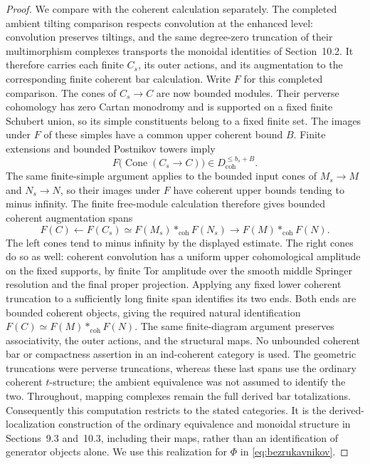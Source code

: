 \documentclass[11pt]{article}
\numberwithin{equation}{section}
\theoremstyle{definition}
\theoremstyle{remark}
\begin{document}
\begin{proof}
We compare with the coherent calculation separately.  The completed
ambient tilting comparison respects convolution at the enhanced
level: convolution preserves tiltings, and the same degree-zero
truncation of their multimorphism complexes transports the monoidal
identities of Section~10.2.  It therefore carries each finite
$C_s$, its outer actions, and its augmentation to the corresponding
finite coherent bar calculation.  Write $F$ for this completed
comparison.  The cones of $C_s\to C$ are now bounded modules.
Their perverse cohomology has zero Cartan monodromy and is supported
on a fixed finite Schubert union, so its simple constituents belong
to a fixed finite set.  The images under $F$ of these simples have
a common upper coherent bound $B$.  Finite extensions and bounded
Postnikov towers imply
\[
 F\bigl(\operatorname{Cone}(C_s\to C)\bigr)
     \in D^{\leq b_s+B}_{\mathrm{coh}}.
\]
The same finite-simple argument applies to the bounded input
cones of $M_s\to M$ and $N_s\to N$, so their images under $F$
have coherent upper bounds tending to minus infinity.  The finite
free-module calculation therefore gives bounded coherent
augmentation spans
\[
 F(C)\longleftarrow F(C_s)
    \simeq F(M_s)*_{\mathrm{coh}}F(N_s)
    \longrightarrow F(M)*_{\mathrm{coh}}F(N).
\]
The left cones tend to minus infinity by the displayed estimate.
The right cones do so as well: coherent convolution has a uniform
upper cohomological amplitude on the fixed supports, by finite
Tor amplitude over the smooth middle Springer resolution and the
final proper projection.  Applying any fixed lower coherent
truncation to a sufficiently long finite span identifies its two
ends.  Both ends are bounded coherent objects, giving the required
natural identification
$F(C)\simeq F(M)*_{\mathrm{coh}}F(N)$.
The same finite-diagram argument preserves associativity, the
outer actions, and the structural maps.  No unbounded coherent
bar or compactness assertion in an ind-coherent category is used.
The geometric truncations were perverse truncations, whereas these
last spans use the ordinary coherent $t$-structure; the ambient
equivalence was not assumed to identify the two.  Throughout,
mapping complexes remain the full derived bar totalizations.
Consequently this computation restricts to the stated categories.
It is the derived-localization construction of the ordinary
equivalence and monoidal structure in Sections~9.3 and~10.3,
including their maps, rather than an identification of generator
objects alone.  We use this realization for $\Phi$ in
\eqref{eq:bezrukavnikov}.


\end{proof}
\end{document}
